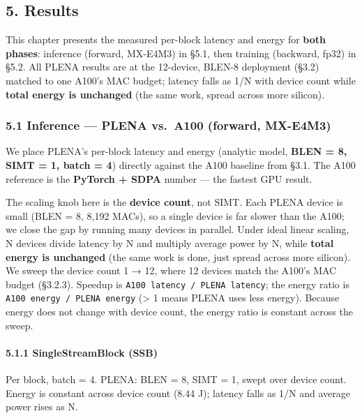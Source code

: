 \documentclass[
  10pt,
]{article}
\begin{document}
\subsection{5. Results}\label{results}

This chapter presents the measured per-block latency and energy for
\textbf{both phases}: inference (forward, MX-E4M3) in §5.1, then training
(backward, fp32) in §5.2. All PLENA results are at the 12-device, BLEN-8
deployment (§3.2) matched to one A100's MAC budget; latency falls as 1/N
with device count while \textbf{total energy is unchanged} (the same
work, spread across more silicon).

\subsubsection{5.1 Inference --- PLENA vs.~A100 (forward,
MX-E4M3)}\label{plena-vs.-a100}

We place PLENA's per-block latency and energy (analytic model,
\textbf{BLEN = 8, SIMT = 1, batch = 4}) directly against the A100
baseline from §3.1. The A100 reference is the \textbf{PyTorch + SDPA}
number --- the fastest GPU result.

The scaling knob here is the \textbf{device count}, not SIMT. Each PLENA
device is small (BLEN = 8, 8,192 MACs), so a single device is far slower
than the A100; we close the gap by running many devices in parallel.
Under ideal linear scaling, N devices divide latency by N and multiply
average power by N, while \textbf{total energy is unchanged} (the same
work is done, just spread across more silicon). We sweep the device
count 1 → 12, where 12 devices match the A100's MAC budget (§3.2.3).
Speedup is \texttt{A100\ latency\ /\ PLENA\ latency}; the energy ratio
is \texttt{A100\ energy\ /\ PLENA\ energy} (\textgreater{} 1 means PLENA
uses less energy). Because energy does not change with device count, the
energy ratio is constant across the sweep.

\paragraph{5.1.1 SingleStreamBlock (SSB)}\label{singlestreamblock-ssb}

Per block, batch = 4. PLENA: BLEN = 8, SIMT = 1, swept over device
count. Energy is constant across device count (8.44 J); latency falls as
1/N and average power rises as N.
\end{document}
